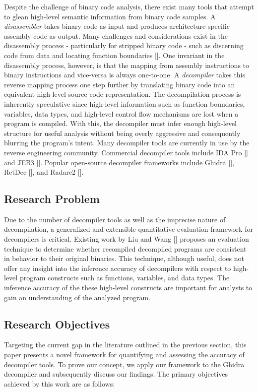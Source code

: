 \documentclass[conference]{IEEEtran}
\begin{document}
Despite the challenge of binary code analysis, there exist many tools that attempt to glean high-level semantic information from binary code samples. A \emph{disassembler} takes binary code as input and produces architecture-specific assembly code as output. Many challenges and considerations exist in the disassembly process - particularly for stripped binary code - such as discerning code from data and locating function boundaries []. One invariant in the disassembly process, however, is that the mapping from assembly instructions to binary instructions and vice-versa is always one-to-one. A \emph{decompiler} takes this reverse mapping process one step further by translating binary code into an equivalent high-level source code representation. The decompilation process is inherently speculative since high-level information such as function boundaries, variables, data types, and high-level control flow mechanisms are lost when a program is compiled. With this, the decompiler must infer enough high-level structure for useful analysis without being overly aggressive and consequently blurring the program's intent. Many decompiler tools are currently in use by the reverse engineering community. Commercial decompiler tools include IDA Pro [] and JEB3 []. Popular open-source decompiler frameworks include Ghidra [], RetDec [], and Radare2 [].

\subsection{Research Problem}

Due to the number of decompiler tools as well as the imprecise nature of decompilation, a generalized and extensible quantitative evaluation framework for decompilers is critical. Existing work by Liu and Wang [] proposes an evaluation technique to determine whether recompiled decompiled programs are consistent in behavior to their original binaries. This technique, although useful, does not offer any insight into the inference accuracy of decompilers with respect to high-level program constructs such as functions, variables, and data types. The inference accuracy of the these high-level constructs are important for analysts to gain an understanding of the analyzed program.

\subsection{Research Objectives}

Targeting the current gap in the literature outlined in the previous section, this paper presents a novel framework for quantifying and assessing the accuracy of decompiler tools. To prove our concept, we apply our framework to the Ghidra decompiler and subsequently discuss our findings. The primary objectives achieved by this work are as follows:
\end{document}
